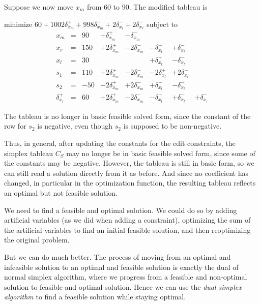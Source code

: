 \documentclass{article}
\begin{document}
Suppose we now move $x_m$ from 60 to 90.  
The modified tableau is 
\begin{trivlist}\item
minimize $60 + 1002 \delta_{x_m}^+ + 998 \delta_{x_m}^-  + 2
\delta_{x_l}^- + 2\delta_{x_r}^- $ 
subject to 
$$
\begin{array}{rlrrrrrr} 
x_m & = &90 &  + \delta_{x_m}^+ & - \delta_{x_m}^- \\
x_r & = &150 & + 2 \delta_{x_m}^+ & - 2\delta_{x_m}^- &
		- \delta_{x_l}^+ & + \delta_{x_l}^- \\ \hline
x_l & = & 30  & & & + \delta_{x_l}^+ & - \delta_{x_l}^- \\
s_1 & = &110 &  + 2 \delta_{x_m}^+ & - 2\delta_{x_m}^- &
		-2 \delta_{x_l}^+ & +2 \delta_{x_l}^- \\
s_2 & = &-50 &   - 2 \delta_{x_m}^+ &+2\delta_{x_m}^- &
		+ \delta_{x_l}^+ & - \delta_{x_l}^- \\
\delta_{x_r}^+ & = & 60 & + 2 \delta_{x_m}^+  & - 2\delta_{x_m}^- &
	- \delta_{x_l}^+ & + \delta_{x_l}^- & +\delta_{x_r}^-
\end{array}
$$
\end{trivlist}
The tableau is no longer in basic feasible solved form,
since the constant of the row 
for $s_2$ is negative, even though $s_2$ is supposed to be non-negative.

Thus, in general, after updating the constants for the edit constraints,
the simplex tableau $C_S$ may no longer be in basic feasible solved form,
since some of the constants may be negative.  However, the tableau is still
in basic form, so we can still read a solution directly from it as before.
And since no coefficient has changed, in particular in the optimization
function, the resulting tableau reflects an optimal but not feasible
solution.

We need to find a feasible and optimal solution.  We could do so by adding
artificial variables (as we did when adding a constraint), optimizing the
sum of the artificial variables to find an initial feasible solution, and
then reoptimizing the original problem.

But we can do much better.  The process of moving from an optimal and
infeasible solution to an optimal and feasible solution is exactly the dual
of normal simplex algorithm, where we progress from a feasible and
non-optimal solution to feasible and optimal solution.  Hence we can use
the \emph{dual simplex algorithm} to find a feasible solution while staying
optimal.
\end{document}
